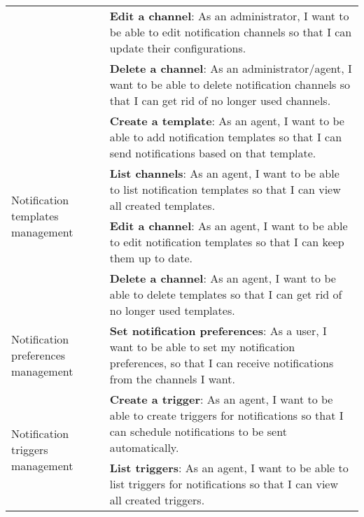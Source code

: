 \begin{longtable}{ | m{}  | m{} | }
      \cline{2-2}
                                                              & \textbf{Edit a channel}: As an administrator, I want to be able to edit notification channels so that I can update their configurations.                                                     \\
      \cline{2-2}
                                                              & \textbf{Delete a channel}: As an administrator/agent, I want to be able to delete notification channels so that I can get rid of no longer used channels.                                    \\
      \hline
      \multirow[t]{4}{5em}{Notification templates management} & \textbf{Create a template}: As an agent, I want to be able to add notification templates so that I can send notifications based on that template.                                            \\
      \cline{2-2}
                                                              & \textbf{List channels}: As an agent, I want to be able to list notification templates so that I can view all created templates.                                                              \\
      \cline{2-2}
                                                              & \textbf{Edit a channel}: As an agent, I want to be able to edit notification templates so that I can keep them up to date.                                                                   \\
      \cline{2-2}
                                                              & \textbf{Delete a channel}: As an agent, I want to be able to delete templates so that I can get rid of no longer used templates.                                                             \\
      \hline
      Notification preferences management                     & \textbf{Set notification preferences}: As a user, I want to be able to set my notification preferences, so that I can receive notifications from the channels I want.                        \\
      \hline
      \multirow[t]{4}{5em}{Notification triggers management}  & \textbf{Create a trigger}: As an agent, I want to be able to create triggers for notifications so that I can schedule notifications to be sent automatically.                                \\
      \cline{2-2}
                                                              & \textbf{List triggers}: As an agent, I want to be able to list triggers for notifications so that I can view all created triggers.                                                           \\

\end{longtable}
